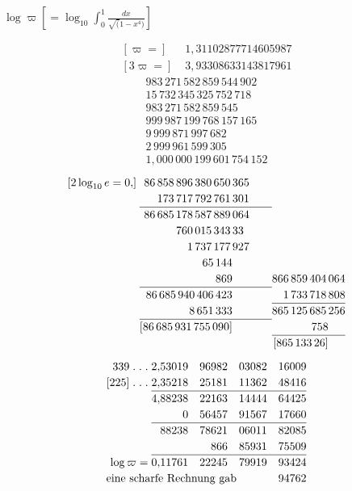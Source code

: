 \begingroup
\clearpage{}
\noindent{\small[S. 246]}\par
\begin{center} $\displaystyle\log\varpi\left[=\log_{10}\int_0^1\frac{dx}{\surd(1-x^4)}\right]$\end{center}
\[\begin{aligned}
[\varpi=]\;&1{,}31102877714605987\\
{}[3\varpi=]\;&3{,}93308633143817961
\end{aligned}\]
\[\renewcommand{\arraystretch}{1.18}\begin{array}{r}
983\,271\,582\,859\,544\,902\\
15\,732\,345\,325\,752\,718\\
983\,271\,582\,859\,545\\ \hline
999\,987\,199\,768\,157\,165\\
9\,999\,871\,997\,682\\
2\,999\,961\,599\,305\\ \hline
1{,}000\,000\,199\,601\,754\,152
\end{array}\]
\clearpage
\[\renewcommand{\arraystretch}{1.18}\begin{array}{@{}r@{\;}r@{\qquad}r@{}}
[2\log_{10}e=0{,}]&86\,858\,896\,380\,650\,365&\\
&173\,717\,792\,761\,301&\\ \cline{2-2}
&86\,685\,178\,587\,889\,064&\\
&760\,015\,343\,33\phantom{0}&\\
&1\,737\,177\,927&\\
&65\,144\phantom{000}&\\
&869\phantom{000}&866\,859\,404\,064\\ \cline{2-2}
&86\,685\,940\,406\,423\phantom{000}&1\,733\,718\,808\\ \cline{3-3}
&8\,651\,333\phantom{000}&865\,125\,685\,256\\ \cline{2-2}
&[86\,685\,931\,755\,090]\phantom{000}&758\phantom{000}\\ \cline{3-3}
&&[865\,133\,26]\phantom{000}
\end{array}\]
\clearpage{}
\[\renewcommand{\arraystretch}{1.18}\begin{array}{@{}r@{\;}rrrr@{}}
339\;{.}\;{.}\;{.}&2{,}53019&96982&03082&16009\\
{}[225]\;{.}\;{.}\;{.}&2{,}35218&25181&11362&48416\\ \cline{2-5}
&4{,}88238&22163&14444&64425\\
&0&56457&91567&17660\\ \cline{2-5}
&88238&78621&06011&82085\\
&&866&85931&75509\\ \cline{2-5}
\log\varpi=&0{,}11761&22245&79919&93424\\
\multicolumn{4}{@{}l}{\text{eine scharfe Rechnung gab}}&94762
\end{array}\]
